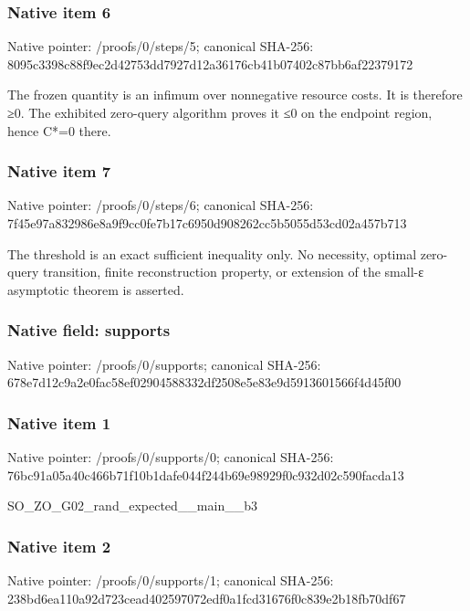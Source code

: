 \documentclass[10pt,a4paper]{article}
\begin{document}
\subsubsection{Native item 6}
Native pointer: /proofs/0/steps/5; canonical SHA-256: 8095c3398c88f9ec2d42753dd7927d12a36176cb41b07402c87bb6af22379172

\begingroup\raggedright\sloppy The frozen quantity is an infimum over nonnegative resource costs. It is therefore {\AtlasUnicodeSymbols ≥}\allowbreak{}0. The exhibited zero-query algorithm proves it {\AtlasUnicodeSymbols ≤}\allowbreak{}0 on the endpoint region,\allowbreak{} hence C*=\allowbreak{}0 there.\par\endgroup

\subsubsection{Native item 7}
Native pointer: /proofs/0/steps/6; canonical SHA-256: 7f45e97a832986e8a9f9cc0fe7b17c6950d908262cc5b5055d53cd02a457b713

\begingroup\raggedright\sloppy The threshold is an exact sufficient inequality only. No necessity,\allowbreak{} optimal zero-query transition,\allowbreak{} finite reconstruction property,\allowbreak{} or extension of the small-{\AtlasUnicodeText ε}\allowbreak{} asymptotic theorem is asserted.\par\endgroup

\subsubsection{Native field: supports}
Native pointer: /proofs/0/supports; canonical SHA-256: 678e7d12c9a2e0fac58ef02904588332df2508e5e83e9d5913601566f4d45f00

\subsubsection{Native item 1}
Native pointer: /proofs/0/supports/0; canonical SHA-256: 76bc91a05a40c466b71f10b1dafe044f244b69e98929f0c932d02c590facda13

\begingroup\raggedright\sloppy SO\_\allowbreak{}ZO\_\allowbreak{}G02\_\allowbreak{}rand\_\allowbreak{}expected\_\allowbreak{}\_\allowbreak{}main\_\allowbreak{}\_\allowbreak{}b3\par\endgroup

\subsubsection{Native item 2}
Native pointer: /proofs/0/supports/1; canonical SHA-256: 238bd6ea110a92d723cead402597072edf0a1fcd31676f0c839e2b18fb70df67
\end{document}
